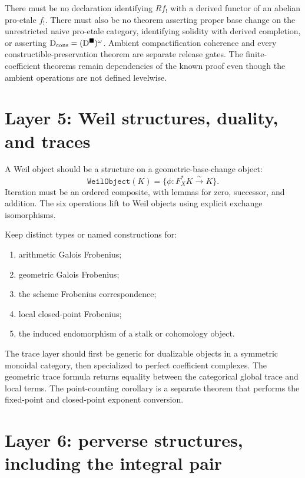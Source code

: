 \begin{auditbox}
There must be no declaration identifying \(Rf_!\) with a derived functor of
an abelian pro-etale \(f_!\).  There must also be no theorem asserting proper
base change on the unrestricted naive pro-etale category, identifying
solidity with derived completion, or asserting
\(\mathrm D_{\mathrm{cons}}=(\mathrm D^{\blacksquare})^\omega\).  Ambient compactification coherence and every
constructible-preservation theorem are separate release gates.  The
finite-coefficient theorems remain dependencies of the known proof even
though the ambient operations are not defined levelwise.
\end{auditbox}

\section{Layer 5: Weil structures, duality, and traces}

A Weil object should be a structure on a geometric-base-change object:
\[
 \texttt{WeilObject}(K)
   =\{\phi:F_X^*K\xrightarrow{\sim}K\}.
\tag{C.7}\label{eq:formalization-weil-object}
\]
Iteration must be an ordered composite, with lemmas for zero, successor, and
addition.  The six operations lift to Weil objects using explicit exchange
isomorphisms.

Keep distinct types or named constructions for:

\begin{enumerate}
\item arithmetic Galois Frobenius;
\item geometric Galois Frobenius;
\item the scheme Frobenius correspondence;
\item local closed-point Frobenius;
\item the induced endomorphism of a stalk or cohomology object.
\end{enumerate}

The trace layer should first be generic for dualizable objects in a symmetric
monoidal category, then specialized to perfect coefficient complexes.
The geometric trace formula returns equality between the categorical global
trace and local terms.  The point-counting corollary is a separate theorem
that performs the fixed-point and closed-point exponent conversion.

\section{Layer 6: perverse structures, including the integral pair}

